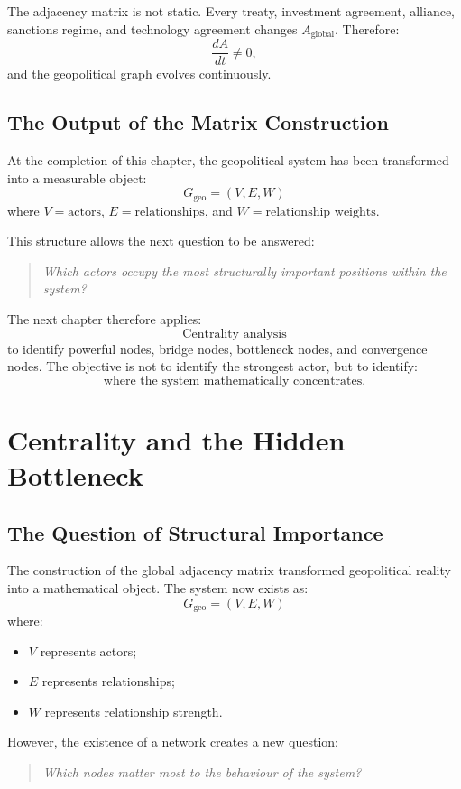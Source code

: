 \documentclass[11pt,openany]{book}
\theoremstyle{plain}
\theoremstyle{definition}
\begin{document}
The adjacency matrix is not static. Every treaty, investment agreement, alliance, sanctions regime, and technology agreement changes \(A_{\text{global}}\). Therefore:
\[
\frac{dA}{dt} \neq 0,
\]
and the geopolitical graph evolves continuously.

\section*{The Output of the Matrix Construction}

At the completion of this chapter, the geopolitical system has been transformed into a measurable object:
\[
G_{\text{geo}} = (V, E, W)
\]
where \(V = \text{actors}\), \(E = \text{relationships}\), and \(W = \text{relationship weights}\).

This structure allows the next question to be answered:
\begin{quote}
\textit{Which actors occupy the most structurally important positions within the system?}
\end{quote}

The next chapter therefore applies:
\[
\boxed{
\text{Centrality analysis}
}
\]
to identify powerful nodes, bridge nodes, bottleneck nodes, and convergence nodes. The objective is not to identify the strongest actor, but to identify:
\[
\boxed{
\text{where the system mathematically concentrates.}
}
\]


\chapter{Centrality and the Hidden Bottleneck}

\section*{The Question of Structural Importance}

The construction of the global adjacency matrix transformed geopolitical reality into a mathematical object. The system now exists as:
\[
G_{\text{geo}} = (V, E, W)
\]
where:
\begin{itemize}
\item \(V\) represents actors;
\item \(E\) represents relationships;
\item \(W\) represents relationship strength.
\end{itemize}

However, the existence of a network creates a new question:
\begin{quote}
\textit{Which nodes matter most to the behaviour of the system?}
\end{quote}
\end{document}
